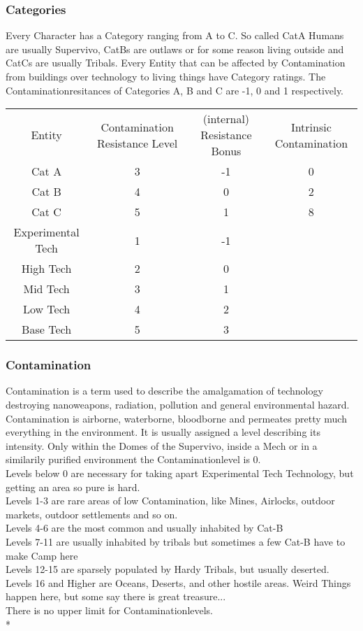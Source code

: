 \documentclass{article}
\begin{document}
    \subsubsection{Categories}
    Every Character has a Category ranging from A to C. So called CatA Humans are usually Supervivo, CatBs are outlaws or
    for some reason living outside and CatCs are usually Tribals.
    Every Entity that can be affected by Contamination from buildings over technology to living things have Category ratings.
    The Contaminationresitances of Categories A, B and C are -1, 0 and 1 respectively.\\\newline
    \begin{tabular}{c|ccc}
        Entity & Contamination Resistance Level & (internal) Resistance Bonus & Intrinsic Contamination\\
        Cat A & 3 & -1 & 0\\
        Cat B & 4 & 0 & 2\\
        Cat C & 5 & 1 & 8\\
        Experimental Tech & 1 & -1 \\
        High Tech & 2 & 0 \\
        Mid Tech & 3 & 1\\
        Low Tech & 4 & 2 \\
        Base Tech & 5 & 3 \\
    \end{tabular}\newline\newline

    \subsubsection{Contamination}
    Contamination is a term used to describe the amalgamation of technology destroying nanoweapons, radiation, pollution
    and general environmental hazard. Contamination is airborne, waterborne, bloodborne and permeates pretty much
    everything in the environment. It is usually assigned a level describing its intensity. Only within the Domes
    of the Supervivo, inside a Mech or in a similarily purified environment the Contaminationlevel is 0. \\
    Levels below 0 are necessary for taking apart Experimental Tech Technology, but getting an area so pure is hard.\\
    Levels 1-3
    are rare areas of low Contamination, like Mines, Airlocks, outdoor markets, outdoor settlements and so on. \\
    Levels 4-6
    are the most common and usually inhabited by Cat-B\\
    Levels 7-11
    are usually inhabited by tribals but sometimes a few Cat-B have to make Camp here \\
    Levels 12-15
    are sparsely populated by Hardy Tribals, but usually deserted.\\
    Levels 16 and Higher
    are Oceans, Deserts, and other hostile areas. Weird Things happen here, but some say there is great treasure...\\
    There is no upper limit for Contaminationlevels. \\*
\end{document}
